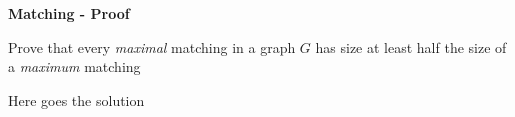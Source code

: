 \question \textbf{Matching - Proof}

Prove that every \textit{maximal} matching in a graph $G$ has size at least half the size of a \textit{maximum} matching

\begin{solution}
Here goes the solution
\end{solution}
